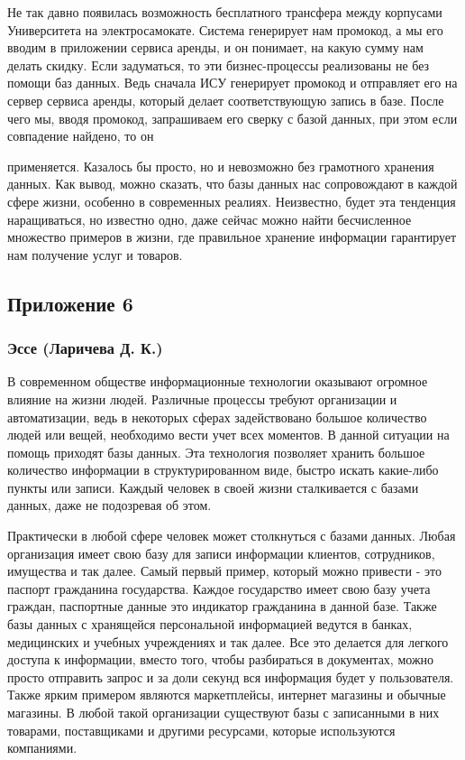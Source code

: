 \documentclass[a4paper,14pt]{extarticle}
\begin{document}
Не так давно появилась возможность бесплатного трансфера между корпусами Университета на электросамокате. Система генерирует нам промокод, а мы его вводим в приложении сервиса аренды, и он понимает, на какую сумму нам делать скидку. Если задуматься, то эти бизнес-процессы реализованы не без помощи баз данных. Ведь сначала ИСУ генерирует промокод и отправляет его на сервер сервиса аренды, который делает соответствующую запись в базе. После чего мы, вводя промокод, запрашиваем его сверку с базой данных, при этом если совпадение найдено, то он

применяется. Казалось бы просто, но и невозможно без грамотного хранения данных.
Как вывод, можно сказать, что базы данных нас сопровождают в каждой сфере жизни, особенно в современных реалиях. Неизвестно, будет эта тенденция наращиваться, но известно одно, даже сейчас можно найти бесчисленное множество примеров в жизни, где правильное хранение информации гарантирует нам получение услуг и товаров.

\newpage

\subsection*{\hfill Приложение 6}

\subsubsection*{\centering Эссе (Ларичева Д. К.)}

В современном обществе информационные технологии оказывают огромное влияние на жизни людей. Различные процессы требуют организации и автоматизации, ведь в некоторых сферах задействовано большое количество людей или вещей, необходимо вести учет всех моментов. В данной ситуации на помощь приходят базы данных. Эта технология позволяет хранить большое количество информации в структурированном виде, быстро искать какие-либо пункты или записи. Каждый человек в своей жизни сталкивается с базами данных, даже не подозревая об этом.

Практически в любой сфере человек может столкнуться с базами данных. Любая организация имеет свою базу для записи информации клиентов, сотрудников, имущества и так далее. Самый первый пример, который можно привести - это паспорт гражданина государства. Каждое государство имеет свою базу учета граждан, паспортные данные это индикатор гражданина в данной базе. Также базы данных с хранящейся персональной информацией ведутся в банках, медицинских и учебных учреждениях и так далее. Все это делается для легкого доступа к информации, вместо того, чтобы разбираться в документах, можно просто отправить запрос и за доли секунд вся информация будет у пользователя. Также ярким примером являются маркетплейсы, интернет магазины и обычные магазины. В любой такой организации существуют базы с записанными в них товарами, поставщиками и другими ресурсами, которые используются компаниями.
\end{document}
